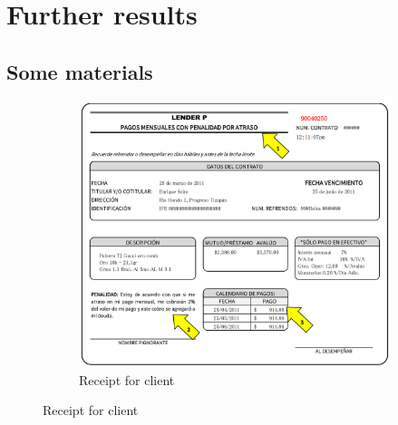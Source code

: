 \documentclass[oneside,11pt]{article}
\begin{document}
\section{ Further results}
\vspace{.2in}


\subsection{Some materials}

\vspace{.1in}
\begin{figure}[H]
     \caption{Contract Terms Summary, and Promise Slip}
    \label{PaperSlip}
    \begin{center}
    \begin{subfigure}{0.65\textwidth}
    \caption{Receipt for client}
        \centering
        \includegraphics[width=\textwidth]{Figuras/TicketLenderP.png}
    \end{subfigure}
    

\end{center}
\end{figure}
\end{document}

